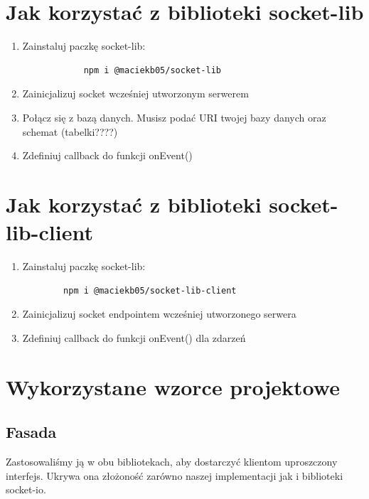 \documentclass{sprawozdanie-agh}
\begin{document}
	
	\section{Jak korzystać z biblioteki socket-lib}
	\begin{enumerate}
		\item Zainstaluj paczkę socket-lib:
		\begin{lstlisting}
			npm i @maciekb05/socket-lib
		\end{lstlisting}
		\item Zainicjalizuj socket wcześniej utworzonym serwerem
		\item Połącz się z bazą danych. Musisz podać
		URI twojej bazy danych oraz schemat (tabelki????) 
		\item Zdefiniuj callback do funkcji onEvent()
	\end{enumerate}
	\section{Jak korzystać z biblioteki socket-lib-client}
	\begin{enumerate}
		\item Zainstaluj paczkę socket-lib:
		\begin{lstlisting}
		npm i @maciekb05/socket-lib-client
		\end{lstlisting}
		\item Zainicjalizuj socket endpointem wcześniej utworzonego serwera
		\item Zdefiniuj callback do funkcji onEvent() dla zdarzeń
	\end{enumerate}
	\section{Wykorzystane wzorce projektowe}
	\subsection{Fasada}
	
	Zastosowaliśmy ją w obu bibliotekach, aby dostarczyć klientom uproszczony interfejs. Ukrywa ona złożoność zarówno naszej implementacji jak i biblioteki socket-io.
	
\end{document}
